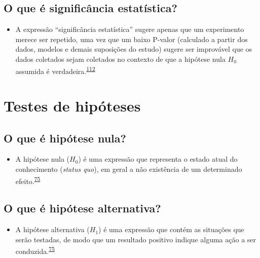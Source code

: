 \documentclass[
  a4paper,
]{book}
\providecommand{\tightlist}{%
  \setlength{\itemsep}{0pt}\setlength{\parskip}{0pt}}
\begin{document}
\hypertarget{o-que-uxe9-significuxe2ncia-estatuxedstica}{%
\subsection{O que é significância estatística?}\label{o-que-uxe9-significuxe2ncia-estatuxedstica}}

\begin{itemize}
\tightlist
\item
  A expressão ``significância estatística'' sugere apenas que um experimento merece ser repetido, uma vez que um baixo P-valor (calculado a partir dos dados, modelos e demais suposições do estudo) sugere ser improvável que os dados coletados sejam coletados no contexto de que a hipótese nula \(H_{0}\) assumida é verdadeira.\textsuperscript{\protect\hyperlink{ref-aylmerfisher1926}{112}}
\end{itemize}

\hypertarget{erros-inferencia}{%
\section{Testes de hipóteses}\label{erros-inferencia}}

\hypertarget{o-que-uxe9-hipuxf3tese-nula}{%
\subsection{O que é hipótese nula?}\label{o-que-uxe9-hipuxf3tese-nula}}

\begin{itemize}
\tightlist
\item
  A hipótese nula (\(H_{0}\)) é uma expressão que representa o estado atual do conhecimento (\emph{status quo}), em geral a não existência de um determinado efeito.\textsuperscript{\protect\hyperlink{ref-kanji2006}{75}}
\end{itemize}

\hypertarget{o-que-uxe9-hipuxf3tese-alternativa}{%
\subsection{O que é hipótese alternativa?}\label{o-que-uxe9-hipuxf3tese-alternativa}}

\begin{itemize}
\tightlist
\item
  A hipótese alternativa (\(H_{1}\)) é uma expressão que contém as situações que serão testadas, de modo que um resultado positivo indique alguma ação a ser conduzida.\textsuperscript{\protect\hyperlink{ref-kanji2006}{75}}
\end{itemize}
\end{document}
